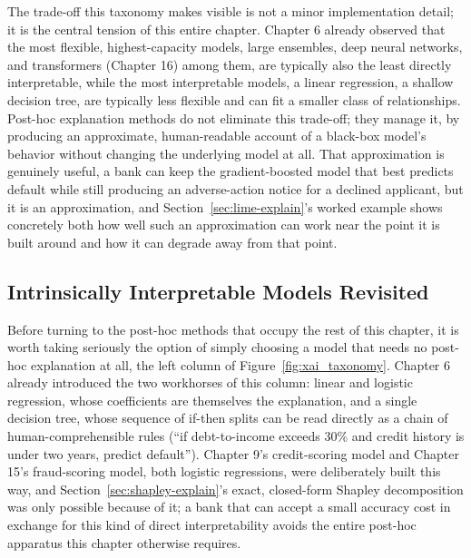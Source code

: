 \documentclass[../ai_in_finance]{subfiles}
\begin{document}
The trade-off this taxonomy makes visible is not a minor implementation detail; it is the central tension of this entire chapter. Chapter 6 already observed that the most flexible, highest-capacity models, large ensembles, deep neural networks, and transformers (Chapter 16) among them, are typically also the least directly interpretable, while the most interpretable models, a linear regression, a shallow decision tree, are typically less flexible and can fit a smaller class of relationships. Post-hoc explanation methods do not eliminate this trade-off; they manage it, by producing an approximate, human-readable account of a black-box model's behavior without changing the underlying model at all. That approximation is genuinely useful, a bank can keep the gradient-boosted model that best predicts default while still producing an adverse-action notice for a declined applicant, but it is an approximation, and Section~\ref{sec:lime-explain}'s worked example shows concretely both how well such an approximation can work near the point it is built around and how it can degrade away from that point.

\subsection{Intrinsically Interpretable Models Revisited}
\label{sec:intrinsic-models}

Before turning to the post-hoc methods that occupy the rest of this chapter, it is worth taking seriously the option of simply choosing a model that needs no post-hoc explanation at all, the left column of Figure~\ref{fig:xai_taxonomy}. Chapter 6 already introduced the two workhorses of this column: linear and logistic regression, whose coefficients are themselves the explanation, and a single decision tree, whose sequence of if-then splits can be read directly as a chain of human-comprehensible rules (``if debt-to-income exceeds 30\% and credit history is under two years, predict default''). Chapter 9's credit-scoring model and Chapter 15's fraud-scoring model, both logistic regressions, were deliberately built this way, and Section~\ref{sec:shapley-explain}'s exact, closed-form Shapley decomposition was only possible because of it; a bank that can accept a small accuracy cost in exchange for this kind of direct interpretability avoids the entire post-hoc apparatus this chapter otherwise requires.
\end{document}
